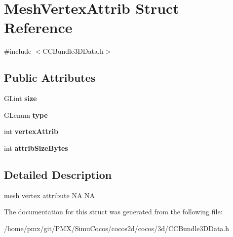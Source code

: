 \hypertarget{structMeshVertexAttrib}{}\section{Mesh\+Vertex\+Attrib Struct Reference}
\label{structMeshVertexAttrib}


{\ttfamily \#include $<$C\+C\+Bundle3\+D\+Data.\+h$>$}

\subsection*{Public Attributes}
\begin{DoxyCompactItemize}
\item 
\mbox{\label{structMeshVertexAttrib_a3cd0fe4d1ee8f521b25e6da213155f27}} 
G\+Lint {\bfseries size}
\item 
\mbox{\label{structMeshVertexAttrib_af171b85d321fc799c19ef1a36e9a1a69}} 
G\+Lenum {\bfseries type}
\item 
\mbox{\label{structMeshVertexAttrib_a0bc9024d5fe68d9c6de184e2ca5fd446}} 
int {\bfseries vertex\+Attrib}
\item 
\mbox{\label{structMeshVertexAttrib_ad80b6a25a9be8f7fdef2a1efaa0ea417}} 
int {\bfseries attrib\+Size\+Bytes}
\end{DoxyCompactItemize}


\subsection{Detailed Description}
mesh vertex attribute  NA  NA 

The documentation for this struct was generated from the following file\+:\begin{DoxyCompactItemize}
\item 
/home/pmx/git/\+P\+M\+X/\+Simu\+Cocos/cocos2d/cocos/3d/C\+C\+Bundle3\+D\+Data.\+h\end{DoxyCompactItemize}
